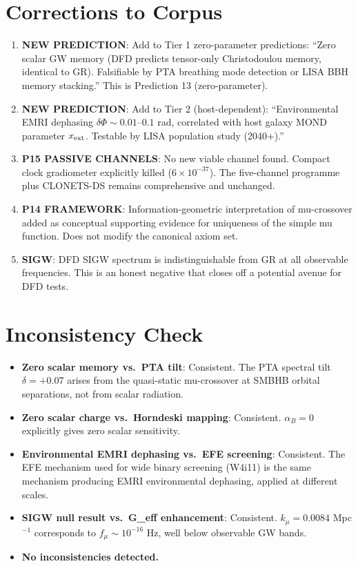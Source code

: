 \documentclass[11pt]{article}
\newcommand{\ee}[1]{\times 10^{#1}}
\newcommand{\kmu}{k_\mu}
\begin{document}
\section{Corrections to Corpus}

\begin{enumerate}

\item \textbf{NEW PREDICTION}: Add to Tier 1 zero-parameter predictions:
  ``Zero scalar GW memory (DFD predicts tensor-only Christodoulou
  memory, identical to GR). Falsifiable by PTA breathing mode
  detection or LISA BBH memory stacking.'' This is Prediction 13
  (zero-parameter).

\item \textbf{NEW PREDICTION}: Add to Tier 2 (host-dependent):
  ``Environmental EMRI dephasing $\delta\Phi \sim 0.01$--$0.1$ rad,
  correlated with host galaxy MOND parameter $x_{\rm ext}$.
  Testable by LISA population study (2040+).''

\item \textbf{P15 PASSIVE CHANNELS}: No new viable channel found.
  Compact clock gradiometer explicitly killed ($6\ee{-37}$).
  The five-channel programme plus CLONETS-DS remains comprehensive
  and unchanged.

\item \textbf{P14 FRAMEWORK}: Information-geometric interpretation
  of mu-crossover added as conceptual supporting evidence for
  uniqueness of the simple mu function. Does not modify the
  canonical axiom set.

\item \textbf{SIGW}: DFD SIGW spectrum is indistinguishable from GR
  at all observable frequencies. This is an honest negative that
  closes off a potential avenue for DFD tests.

\end{enumerate}

\section{Inconsistency Check}

\begin{itemize}[nosep]
\item \textbf{Zero scalar memory vs.\ PTA tilt}: Consistent. The PTA
  spectral tilt $\delta = +0.07$ arises from the quasi-static
  mu-crossover at SMBHB orbital separations, not from scalar radiation.
\item \textbf{Zero scalar charge vs.\ Horndeski mapping}: Consistent.
  $\alpha_B = 0$ explicitly gives zero scalar sensitivity.
\item \textbf{Environmental EMRI dephasing vs.\ EFE screening}: Consistent.
  The EFE mechanism used for wide binary screening (W4i11) is the same
  mechanism producing EMRI environmental dephasing, applied at different
  scales.
\item \textbf{SIGW null result vs.\ G\_eff enhancement}: Consistent.
  $\kmu = 0.0084$ Mpc$^{-1}$ corresponds to $f_\mu \sim 10^{-16}$ Hz,
  well below observable GW bands.
\item \textbf{No inconsistencies detected.}
\end{itemize}
\end{document}
